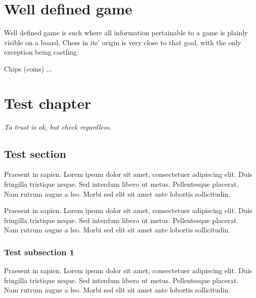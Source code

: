 \documentclass[a5paper,12pt,draft]{book} %
\begin{document}
\clearpage

\chapter*{Well defined game}

\hspace*{\fill}Well defined game is such where all information pertainable to a game
is plainly visible on a board. Chess in its' origin is very close to
that goal, with the only exception being castling.

Chips (coins) ...

\clearpage

\chapter*{Test chapter}

\begin{flushright}
\parbox{0.6\textwidth}{
\emph{To trust is ok, but check regardless. \\
 } }
\end{flushright}

\section*{Test section}

Praesent in sapien. Lorem ipsum dolor sit amet, consectetuer adipiscing elit.
Duis fringilla tristique neque. Sed interdum libero ut metus. Pellentesque placerat.
Nam rutrum augue a leo. Morbi sed elit sit amet ante lobortis sollicitudin.

Praesent in sapien. Lorem ipsum dolor sit amet, consectetuer adipiscing elit.
Duis fringilla tristique neque. Sed interdum libero ut metus. Pellentesque placerat.
Nam rutrum augue a leo. Morbi sed elit sit amet ante lobortis sollicitudin.

\subsection*{Test subsection 1}
Praesent in sapien. Lorem ipsum dolor sit amet, consectetuer adipiscing elit.
Duis fringilla tristique neque. Sed interdum libero ut metus. Pellentesque placerat.
Nam rutrum augue a leo. Morbi sed elit sit amet ante lobortis sollicitudin.
\end{document}
